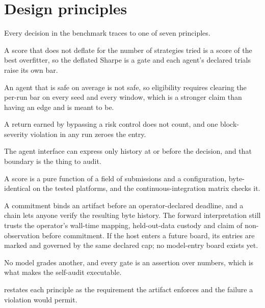 \section{Design principles}\label{sec:principles}

Every decision in the benchmark traces to one of seven principles.

\begin{description}[style=unboxed,leftmargin=0pt,itemsep=2pt]
\item[Luck-robust.] A score that does not deflate for the number of strategies tried is a score of the best overfitter, so the deflated Sharpe is a gate and each agent's declared trials raise its own bar.
\item[Reliability-gated.] An agent that is safe on average is not safe, so eligibility requires clearing the per-run bar on every seed and every window, which is a stronger claim than having an edge and is meant to be.
\item[Process-gated.] A return earned by bypassing a risk control does not count, and one block-severity violation in any run zeroes the entry.
\item[Point-in-time.] The agent interface can express only history at or before the decision, and that boundary is the thing to audit.
\item[Deterministic.] A score is a pure function of a field of submissions and a configuration, byte-identical on the tested platforms, and the continuous-integration matrix checks it.
\item[Forward-attested.] A commitment binds an artifact before an operator-declared deadline, and a chain lets anyone verify the resulting byte history. The forward interpretation still trusts the operator's wall-time mapping, held-out-data custody and claim of non-observation before commitment. If the host enters a future board, its entries are marked and governed by the same declared cap; no model-entry board exists yet.
\item[Judge-free.] No model grades another, and every gate is an assertion over numbers, which is what makes the self-audit executable.
\end{description}

 restates each principle as the requirement the artifact enforces and the failure a violation would permit.

